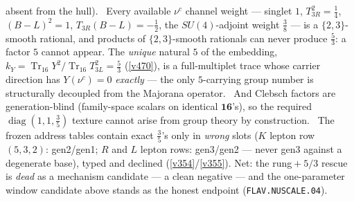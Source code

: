 \documentclass[11pt,a4paper]{article}
\theoremstyle{definition}
\begin{document}
absent from the hull). \mE\ Every available $\nu^c$ channel weight --- singlet $1$, $T_{3R}^2=\tfrac14$,
$(B{-}L)^2=1$, $T_{3R}(B{-}L)=-\tfrac12$, the $SU(4)$-adjoint weight $\tfrac38$ --- is a $\{2,3\}$-smooth
rational, and products of $\{2,3\}$-smooth rationals can never produce $\tfrac53$: a factor $5$ cannot appear.
The \emph{unique} natural $5$ of the embedding, $k_Y=\operatorname{Tr}_{16}Y^2/\operatorname{Tr}_{16}T_{3L}^2
=\tfrac53$ (\vref{v470}), is a full-multiplet trace whose carrier direction has $Y(\nu^c)=0$ \emph{exactly} ---
the only $5$-carrying group number is structurally decoupled from the Majorana operator. \mE\ And Clebsch factors
are generation-blind (family-space scalars on identical $\mathbf{16}$'s), so the required
$\operatorname{diag}(1,1,\tfrac35)$ texture cannot arise from group theory by construction. \mO\ The frozen
address tables contain exact $\tfrac35$'s only in \emph{wrong} slots ($K$ lepton row $(5,3,2)$: gen2/gen1; $R$
and $L$ lepton rows: gen3/gen2 --- never gen3 against a degenerate base), typed and declined
(\vref{v354}/\vref{v355}). Net: the rung${}+{}5/3$ rescue is \emph{dead} as a mechanism candidate --- a clean
negative --- and the one-parameter window candidate above stands as the honest endpoint
(\texttt{FLAV.NUSCALE.04}).

\end{document}
